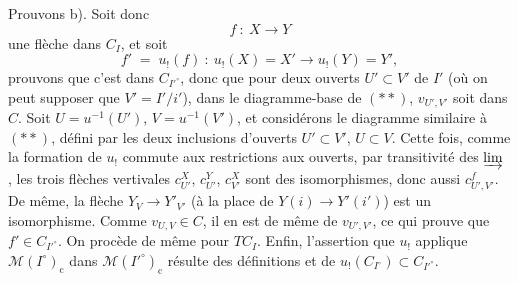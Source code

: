Prouvons b). Soit donc
\[
f\ :\ X\longrightarrow Y
\]
une flèche dans $C_I$, et soit
\[
f' \;=\; u_!(f)\ :\ u_!(X)=X' \longrightarrow u_!(Y)=Y',
\]
prouvons que c'est dans $C_{I'^\circ}$, donc que
pour deux ouverts $U'\subset V'$ de $I'$ (où on peut supposer que $V'=I'/i'$), dans le diagramme-base de $(**)$, $v_{U',V'}$ soit dans $C$. Soit $U=u^{-1}(U')$, $V=u^{-1}(V')$, et considérons le %
diagramme similaire à $(**)$, défini par les deux inclusions d'ouverts $U'\subset V'$, $U\subset V$. Cette fois, comme la formation de $u_!$ commute aux restrictions aux ouverts, par transitivité des $\varinjlim$ , les trois flèches vertivales $c^X_{U'}$, $c^Y_{U'}$, $c^X_{V'}$ sont des isomorphismes, donc aussi $c^f_{U',V'}$. De %
même, la flèche $Y_V\longrightarrow Y'_{V'}$ (à la place de $Y(i)\longrightarrow Y'(i')$) est un isomorphisme. Comme $v_{U,V}\in C$, il en est de même de $v_{U',V'}$, ce qui prouve que $f'\in C_{I'^\circ}$. On procède de même pour $TC_I$. Enfin, l'assertion que $u_!$ applique $\mathcal{M}(I^\circ)_{\mathrm{c}}$ dans $\mathcal{M}(I'^\circ)_{\mathrm{c}}$ résulte des définitions et de $u_!(C_{I^\circ})\subset C_{I'^\circ}$.

